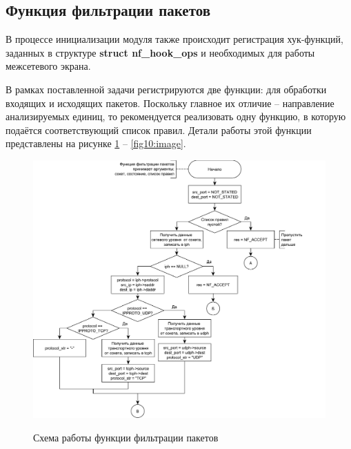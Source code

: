 \pagebreak

\subsection{Функция фильтрации пакетов}
В процессе инициализации модуля также происходит регистрация хук-функций, заданных в структуре \textbf{struct nf\_hook\_ops} и необходимых для работы межсетевого экрана. 

В рамках поставленной задачи регистрируются две функции: для обработки входящих и исходящих пакетов. Поскольку главное их отличие -- направление анализируемых единиц, то рекомендуется реализовать одну функцию, в которую подаётся соответствующий список правил. Детали работы этой функции представлены на рисунке \ref{fig9:image} -- \ref{fig10:image}.

\begin{figure}[h!]
	\begin{center}
		{\includegraphics[scale = 0.55]{img/filter1.pdf}}
		\caption{Схема работы функции фильтрации пакетов}
		\label{fig9:image}
	\end{center}
\end{figure}

